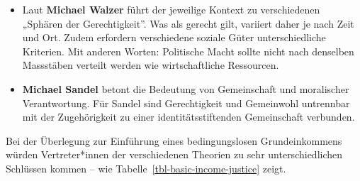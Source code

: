 \documentclass[
  nswissgerman,
  a4paper,
  openany]{book}
\begin{document}
\begin{tcolorbox}
\begin{itemize}
\item
  Laut \textbf{Michael Walzer} führt der jeweilige Kontext zu
  verschiedenen „Sphären der Gerechtigkeit''. Was als gerecht gilt,
  variiert daher je nach Zeit und Ort. Zudem erfordern verschiedene
  soziale Güter unterschiedliche Kriterien. Mit anderen Worten:
  Politische Macht sollte nicht nach denselben Massstäben verteilt
  werden wie wirtschaftliche Ressourcen.
\item
  \textbf{Michael Sandel} betont die Bedeutung von Gemeinschaft und
  moralischer Verantwortung. Für Sandel sind Gerechtigkeit und
  Gemeinwohl untrennbar mit der Zugehörigkeit zu einer
  identitätsstiftenden Gemeinschaft verbunden.
\end{itemize}

\end{tcolorbox}

Bei der Überlegung zur Einführung eines bedingungslosen Grundeinkommens
würden Vertreter*innen der verschiedenen Theorien zu sehr
unterschiedlichen Schlüssen kommen -- wie
Tabelle~\ref{tbl-basic-income-justice} zeigt.

\begingroup\fontsize{9}{11}\selectfont
\end{document}
